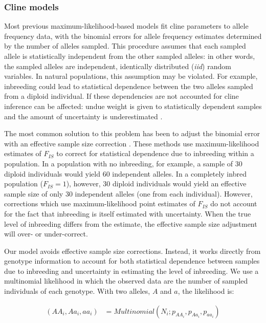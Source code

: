 \documentclass[]{article}
\begin{document}
\subsubsection{Cline models}\label{cline-models}

Most previous maximum-likelihood-based models fit cline parameters to
allele frequency data, with the binomial errors for allele frequency
estimates determined by the number of alleles sampled. This procedure
assumes that each sampled allele is statistically independent from the
other sampled alleles: in other words, the sampled alleles are
independent, identically distributed (\textit{iid}) random variables. In
natural populations, this assumption may be violated. For example,
inbreeding could lead to statistical dependence between the two alleles
sampled from a diploid individual. If these dependencies are not
accounted for cline inference can be affected: undue weight is given to
statistically dependent samples and the amount of uncertainty is
underestimated \citep{Szymura:1986cm}.

The most common solution to this problem has been to adjust the binomial
error with an effective sample size correction
\citep{Szymura:1986cm, Phillips:2004cj, Alexandrino:2005vl, Macholan:2008gg}.
These methods use maximum-likelihood estimates of \(F_{IS}\) to correct
for statistical dependence due to inbreeding within a population. In a
population with no inbreeding, for example, a sample of 30 diploid
individuals would yield 60 independent alleles. In a completely inbred
population (\(F_{IS} = 1\)), however, 30 diploid individuals would yield
an effective sample size of only 30 independent alleles (one from each
individual). However, corrections which use maximum-likelihood point
estimates of \(F_{IS}\) do not account for the fact that inbreeding is
itself estimated with uncertainty. When the true level of inbreeding
differs from the estimate, the effective sample size adjustment will
over- or under-correct.

Our model avoids effective sample size corrections. Instead, it works
directly from genotype information to account for both statistical
dependence between samples due to inbreeding and uncertainty in
estimating the level of inbreeding. We use a multinomial likelihood in
which the observed data are the number of sampled individuals of each
genotype. With two alleles, \(A\) and \(a\), the likelihood is:

\begin{equation}
\label{eq:likelihood}
\begin{split}
(AA_{i}, Aa_{i}, aa_{i}) &= Multinomial(N_{i}; p_{{AA}_{i}}, p_{{Aa}_{i}}, p_{{aa}_{i}})
\end{split}
\end{equation}
\end{document}
